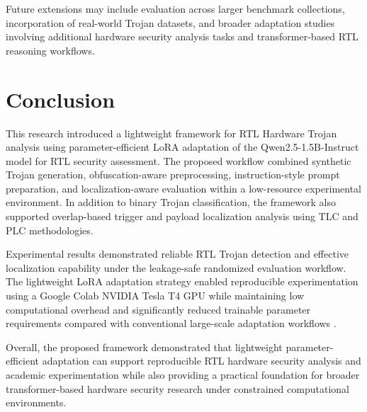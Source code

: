 \documentclass[conference]{IEEEtran}
\begin{document}
Future extensions may include evaluation across larger benchmark collections, incorporation of real-world Trojan datasets, and broader adaptation studies involving additional hardware security analysis tasks and transformer-based RTL reasoning workflows.


\section{Conclusion}
\label{sec:conclusion}

This research introduced a lightweight framework for RTL Hardware Trojan analysis using parameter-efficient LoRA adaptation of the Qwen2.5-1.5B-Instruct model for RTL security assessment. The proposed workflow combined synthetic Trojan generation, obfuscation-aware preprocessing, instruction-style prompt preparation, and localization-aware evaluation within a low-resource experimental environment. In addition to binary Trojan classification, the framework also supported overlap-based trigger and payload localization analysis using TLC and PLC methodologies.

Experimental results demonstrated reliable RTL Trojan detection and effective localization capability under the leakage-safe randomized evaluation workflow. The lightweight LoRA adaptation strategy enabled reproducible experimentation using a Google Colab NVIDIA Tesla T4 GPU while maintaining low computational overhead and significantly reduced trainable parameter requirements compared with conventional large-scale adaptation workflows \cite{lora,qlora,kundu2025pearl}.

Overall, the proposed framework demonstrated that lightweight parameter-efficient adaptation can support reproducible RTL hardware security analysis and academic experimentation while also providing a practical foundation for broader transformer-based hardware security research under constrained computational environments.





\end{document}
